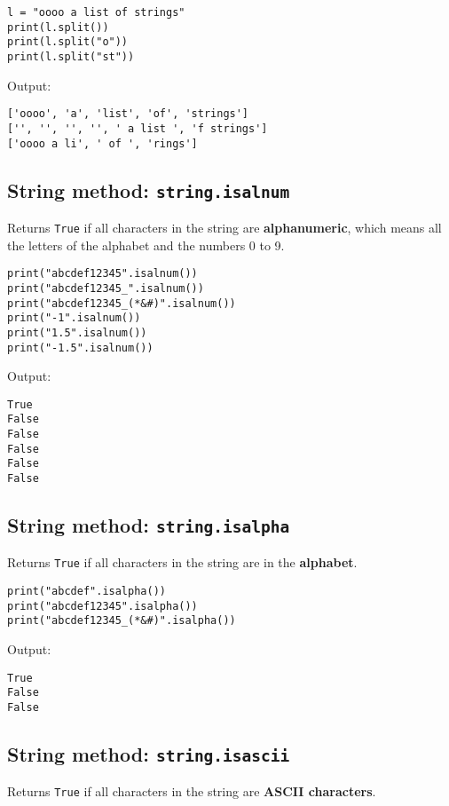 \documentclass[11pt]{article}
\begin{document}
\begin{verbatim}
l = "oooo a list of strings"
print(l.split())
print(l.split("o"))
print(l.split("st"))
\end{verbatim}

 \noindent Output:

\label{org6480993}
\begin{verbatim}
['oooo', 'a', 'list', 'of', 'strings']
['', '', '', '', ' a list ', 'f strings']
['oooo a li', ' of ', 'rings']
\end{verbatim}


 \newpage
\subsection{String method: \texttt{string.isalnum}}
\label{sec:orgc5567a4}
Returns \texttt{True} if all characters in the string are \textbf{alphanumeric}, which means all the letters of the alphabet and the numbers 0 to 9.

\begin{verbatim}
print("abcdef12345".isalnum())
print("abcdef12345_".isalnum())
print("abcdef12345_(*&#)".isalnum())
print("-1".isalnum())
print("1.5".isalnum())
print("-1.5".isalnum())
\end{verbatim}

 \noindent Output:

\label{org1e8e3bb}
\begin{verbatim}
True
False
False
False
False
False
\end{verbatim}
\subsection{String method: \texttt{string.isalpha}}
\label{sec:org321fbfd}
Returns \texttt{True} if all characters in the string are in the \textbf{alphabet}.

\begin{verbatim}
print("abcdef".isalpha())
print("abcdef12345".isalpha())
print("abcdef12345_(*&#)".isalpha())
\end{verbatim}

 \noindent Output:

\label{org1560fd2}
\begin{verbatim}
True
False
False
\end{verbatim}


 \newpage
\subsection{String method: \texttt{string.isascii}}
\label{sec:org2ea57c6}
Returns \texttt{True} if all characters in the string are \textbf{ASCII characters}.
\end{document}
